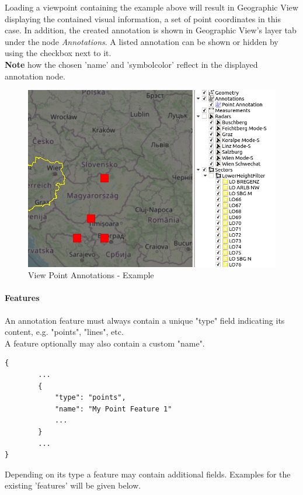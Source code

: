 Loading a viewpoint containing the example above will result in Geographic View displaying the contained visual information,
a set of point coordinates in this case. In addition, the created annotation is shown in Geographic View's layer tab under the node \textit{Annotations}.
A listed annotation can be shown or hidden by using the checkbox next to it. \\

\textbf{Note} how the chosen 'name' and 'symbol\textunderscore color' reflect in the displayed annotation node.

\begin{figure}[H]
    \center
      \includegraphics[width=12cm]{figures/viewpoints_anno_example.png}
    \caption{View Point Annotations - Example} 
\end{figure}

\paragraph{Features} An annotation feature must always contain a unique "type" field
indicating its content, e.g. "points", "lines", etc. \\

A feature optionally may also contain a custom "name".

\begin{lstlisting}[basicstyle=\small\ttfamily]
{
        ...
        {
            "type": "points",
            "name": "My Point Feature 1"
            ...
        }
        ...
}
\end{lstlisting}

Depending on its type a feature may contain additional fields. Examples for the existing 'features' will be given below.

